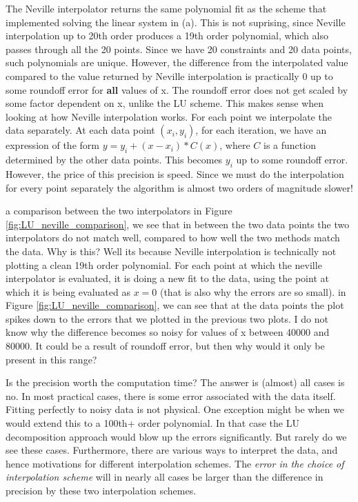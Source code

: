 \documentclass{article}
\begin{document}
The Neville interpolator returns the same polynomial fit as the scheme that implemented solving the linear system in (a).
This is not suprising, since Neville interpolation up to 20th order produces a 19th order polynomial, which also passes through all the 20 points.
Since we have 20 constraints and 20 data points, such polynomials are unique. 
However, the difference from the interpolated value compared to the value returned by Neville interpolation is practically 0 up to some roundoff error for 
\textbf{all} values of x. The roundoff error does not get scaled by some factor dependent on x, unlike the LU scheme. 
This makes sense when looking at how Neville interpolation works.
For each point we interpolate the data separately. 
At each data point $(x_i, y_i)$, for each iteration, we have an expression of the form $y = y_i + (x-x_i)*C(x)$,
where $C$ is a function determined by the other data points. This becomes $y_i$ up to some roundoff error.
However, the price of this precision is speed. Since we must do the interpolation for every point separately the algorithm is almost two orders of magnitude slower!

a comparison between the two interpolators in Figure \ref{fig:LU_neville_comparison}, we see that
in between the two data points the two interpolators do not match well, compared to how well the two methods match the data. 
Why is this? Well its because Neville interpolation is technically not plotting a clean 19th order polynomial. 
For each point at which the neville interpolator is evaluated, it is doing a new fit to the data, 
using the point at which it is being evaluated as $x=0$ (that is also why the errors are so small).
in Figure \ref{fig:LU_neville_comparison}, we can see that at the data points the plot spikes down to 
the errors that we plotted in the previous two plots. I do not know why the difference 
becomes so noisy for values of x between 40000 and 80000. It could be a result of roundoff error, but then 
why would it only be present in this range? 

Is the precision worth the computation time? The answer is (almost) all cases is no.
In most practical cases, there is some error associated with the data itself. 
Fitting perfectly to noisy data is not physical. 
One exception might be when we would extend this to a 100th+ order polynomial. 
In that case the LU decomposition approach would blow up the errors significantly. But rarely do we see these cases.
Furthermore, there are various ways to interpret the data, and hence motivations for different interpolation schemes.
The \textit{error in the choice of interpolation scheme} will in nearly all cases be larger than the difference in precision by 
these two interpolation schemes.
\end{document}
